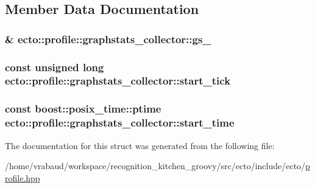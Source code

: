 \subsection{\-Member \-Data \-Documentation}
\hypertarget{structecto_1_1profile_1_1graphstats__collector_a4a6ceeeffacb5f69edc173d5aaf3cf89}{
\subsubsection[{gs\-\_\-}]{\& {\bf ecto\-::profile\-::graphstats\-\_\-collector\-::gs\-\_\-}}}\label{structecto_1_1profile_1_1graphstats__collector_a4a6ceeeffacb5f69edc173d5aaf3cf89}
\hypertarget{structecto_1_1profile_1_1graphstats__collector_a7a840b075fd490da5107ea538614d017}{
\subsubsection[{start\-\_\-tick}]{\setlength{\rightskip}{0pt plus 5cm}const unsigned long {\bf ecto\-::profile\-::graphstats\-\_\-collector\-::start\-\_\-tick}}}\label{structecto_1_1profile_1_1graphstats__collector_a7a840b075fd490da5107ea538614d017}
\hypertarget{structecto_1_1profile_1_1graphstats__collector_a85cb67d72c9d1072634b879776e2e4b8}{
\subsubsection[{start\-\_\-time}]{\setlength{\rightskip}{0pt plus 5cm}const boost\-::posix\-\_\-time\-::ptime {\bf ecto\-::profile\-::graphstats\-\_\-collector\-::start\-\_\-time}}}\label{structecto_1_1profile_1_1graphstats__collector_a85cb67d72c9d1072634b879776e2e4b8}


\-The documentation for this struct was generated from the following file\-:\begin{DoxyCompactItemize}
\item 
/home/vrabaud/workspace/recognition\-\_\-kitchen\-\_\-groovy/src/ecto/include/ecto/\hyperlink{profile_8hpp}{profile.\-hpp}\end{DoxyCompactItemize}

